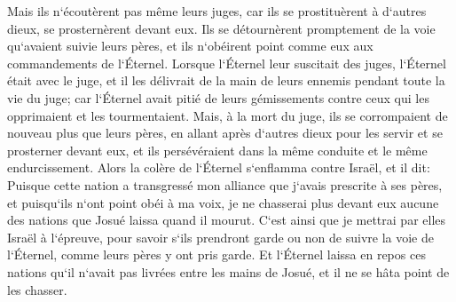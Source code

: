 \verse Mais ils n`écoutèrent pas même leurs juges, car ils se prostituèrent à d`autres dieux, se prosternèrent devant eux. Ils se détournèrent promptement de la voie qu`avaient suivie leurs pères, et ils n`obéirent point comme eux aux commandements de l`Éternel. 
\verse Lorsque l`Éternel leur suscitait des juges, l`Éternel était avec le juge, et il les délivrait de la main de leurs ennemis pendant toute la vie du juge; car l`Éternel avait pitié de leurs gémissements contre ceux qui les opprimaient et les tourmentaient. 
\verse Mais, à la mort du juge, ils se corrompaient de nouveau plus que leurs pères, en allant après d`autres dieux pour les servir et se prosterner devant eux, et ils persévéraient dans la même conduite et le même endurcissement. 
\verse Alors la colère de l`Éternel s`enflamma contre Israël, et il dit: Puisque cette nation a transgressé mon alliance que j`avais prescrite à ses pères, et puisqu`ils n`ont point obéi à ma voix, 
\verse je ne chasserai plus devant eux aucune des nations que Josué laissa quand il mourut. 
\verse C`est ainsi que je mettrai par elles Israël à l`épreuve, pour savoir s`ils prendront garde ou non de suivre la voie de l`Éternel, comme leurs pères y ont pris garde. 
\verse Et l`Éternel laissa en repos ces nations qu`il n`avait pas livrées entre les mains de Josué, et il ne se hâta point de les chasser. 

